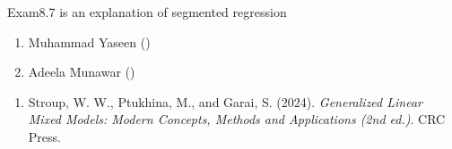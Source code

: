 \documentclass[a4paper]{book}
\begin{document}
%
\begin{Description}
Exam8.7 is an explanation of segmented regression
\end{Description}
%
\begin{Author}
\begin{enumerate}

\item{}  Muhammad Yaseen ()
\item{} Adeela Munawar ()

\end{enumerate}

\end{Author}
%
\begin{References}
\begin{enumerate}

\item{} Stroup, W. W., Ptukhina, M., and Garai, S. (2024).
\emph{Generalized Linear Mixed Models: Modern Concepts, Methods and Applications (2nd ed.)}.
CRC Press.

\end{enumerate}

\end{References}
%
\begin{SeeAlso}
\end{SeeAlso}
%
\end{document}
